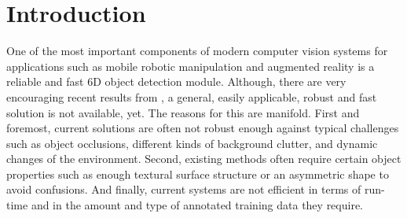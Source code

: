 \section{Introduction}
One of the most important components of modern computer vision systems
for applications such as mobile robotic manipulation and augmented
reality is a reliable and fast 6D object detection module. 
Although, there are very encouraging recent results from \cite{xiang2017posecnn,kehl2017ssd,hodan2017tless,wohlhart2015learning,vidal20186d,hinterstoisser2016going,tremblay2018deep}, a general, easily applicable, robust and fast solution is not available, yet. The
reasons for this are manifold. First and foremost, current solutions
are often not robust enough against typical challenges such as object
occlusions, different kinds of background clutter, and dynamic changes
of the environment. Second, existing methods often require certain
object properties such as enough textural
surface structure or an asymmetric shape to avoid
confusions. And finally, current systems are not efficient in terms
of run-time and in the amount and type of annotated training data they require.


